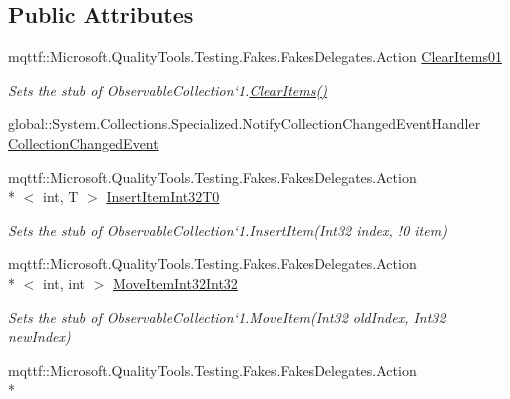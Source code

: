 \subsection*{Public Attributes}
\begin{DoxyCompactItemize}
\item 
mqttf\-::\-Microsoft.\-Quality\-Tools.\-Testing.\-Fakes.\-Fakes\-Delegates.\-Action \hyperlink{class_system_1_1_collections_1_1_object_model_1_1_fakes_1_1_stub_observable_collection_3_01_t_01_4_aecafbbb765d456e5e58815518af365d9}{Clear\-Items01}
\begin{DoxyCompactList}\small\item\em Sets the stub of Observable\-Collection`1.\hyperlink{class_system_1_1_collections_1_1_object_model_1_1_fakes_1_1_stub_observable_collection_3_01_t_01_4_a09bb744b299385dd15380cd3cc73af2d}{Clear\-Items()}\end{DoxyCompactList}\item 
global\-::\-System.\-Collections.\-Specialized.\-Notify\-Collection\-Changed\-Event\-Handler \hyperlink{class_system_1_1_collections_1_1_object_model_1_1_fakes_1_1_stub_observable_collection_3_01_t_01_4_a1c9704046b1fd58ff8088c70534b4f0c}{Collection\-Changed\-Event}
\item 
mqttf\-::\-Microsoft.\-Quality\-Tools.\-Testing.\-Fakes.\-Fakes\-Delegates.\-Action\\*
$<$ int, T $>$ \hyperlink{class_system_1_1_collections_1_1_object_model_1_1_fakes_1_1_stub_observable_collection_3_01_t_01_4_aef25a00a01d4287edaa8471d7aa97264}{Insert\-Item\-Int32\-T0}
\begin{DoxyCompactList}\small\item\em Sets the stub of Observable\-Collection`1.Insert\-Item(Int32 index, !0 item)\end{DoxyCompactList}\item 
mqttf\-::\-Microsoft.\-Quality\-Tools.\-Testing.\-Fakes.\-Fakes\-Delegates.\-Action\\*
$<$ int, int $>$ \hyperlink{class_system_1_1_collections_1_1_object_model_1_1_fakes_1_1_stub_observable_collection_3_01_t_01_4_a2a17254ba69ee3035a7e7c6e8acfdc0c}{Move\-Item\-Int32\-Int32}
\begin{DoxyCompactList}\small\item\em Sets the stub of Observable\-Collection`1.Move\-Item(\-Int32 old\-Index, Int32 new\-Index)\end{DoxyCompactList}\item 
mqttf\-::\-Microsoft.\-Quality\-Tools.\-Testing.\-Fakes.\-Fakes\-Delegates.\-Action\\*

\end{DoxyCompactItemize}
